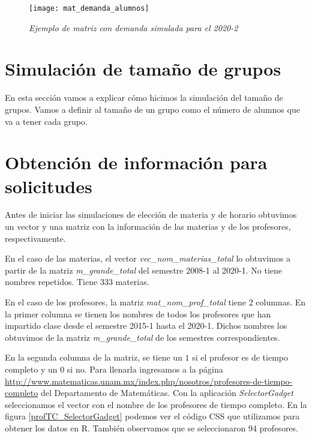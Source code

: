 \begin{figure}[H]
\centering
\texttt{[image: mat\_demanda\_alumnos]} %
\caption{\textit{Ejemplo de matriz con demanda simulada para el 2020-2}}\label{matDemandaAlum}
\end{figure}





\section{Simulación de tamaño de grupos}

En esta sección vamos a explicar cómo hicimos la simulación del tamaño de grupos. Vamos a definir al tamaño de un grupo como el número de alumnos que va a tener cada grupo.






\section{Obtención de información para solicitudes}

Antes de iniciar las simulaciones de elección de materia y de horario obtuvimos un vector y una matriz con la información de las materias y de los profesores, respectivamente.

En el caso de las materias, el vector \textit{vec\_nom\_materias\_total} lo obtuvimos a partir de la matriz \textit{m\_grande\_total} del semestre 2008-1 al 2020-1. No tiene nombres repetidos. Tiene 333 materias.

En el caso de los profesores, la matriz \textit{mat\_nom\_prof\_total} tiene 2 columnas. En la primer columna se tienen los nombres de todos los profesores que han impartido clase desde el semestre 2015-1 hasta el 2020-1. Dichos nombres los obtuvimos de la matriz \textit{m\_grande\_total} de los semestres correspondientes.

En la segunda columna de la matriz, se tiene un $1$ si el profesor es de tiempo completo y un $0$ si no. Para llenarla ingresamos a la página \url{http://www.matematicas.unam.mx/index.php/nosotros/profesores-de-tiempo-completo} del Departamento de Matemáticas. Con la aplicación \textit{SelectorGadget} seleccionamos el vector con el nombre de los profesores de tiempo completo. En la figura \ref{profTC_SelectorGadget} podemos ver el código CSS que utilizamos para obtener los datos en R. También observamos que se seleccionaron 94 profesores.

